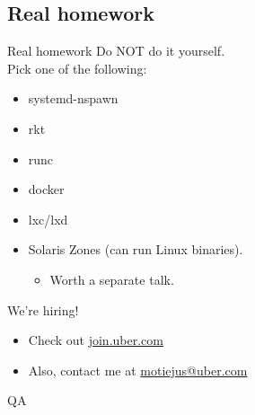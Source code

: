 \documentclass[14pt]{beamer}
\begin{document}
\subsection{Real homework}
\begin{frame}{Real homework}
    Do NOT do it yourself. \\
    \pause
    Pick one of the following:
    \begin{itemize}[<+(1)->]
        \item systemd-nspawn
        \item rkt
        \item runc
        \item docker
        \item lxc/lxd
        \item Solaris Zones (can run Linux binaries).
            \begin{itemize}
                \item Worth a separate talk.
            \end{itemize}
    \end{itemize}
\end{frame}


\begin{frame}{We're hiring!}
    \begin{itemize}
        \item Check out \href{http://join.uber.com}{join.uber.com}
        \item Also, contact me at \href{mailto:motiejus@uber.com}{motiejus@uber.com}
    \end{itemize}
\end{frame}

\begin{frame}{QA}
\end{frame}
\end{document}
